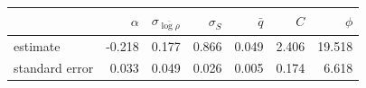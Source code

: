 
\begin{tabular}{lrrrrrr}
\toprule
\phantom{a} & $\alpha$ & $\sigma_{\overline{\log \rho}}$ & $\sigma_{S}$ & $\bar{q}$ & $C$ & $\phi$\\
\midrule
estimate & -0.218 & 0.177 & 0.866 & 0.049 & 2.406 & 19.518\\
standard error & 0.033 & 0.049 & 0.026 & 0.005 & 0.174 & 6.618\\
\bottomrule
\end{tabular}